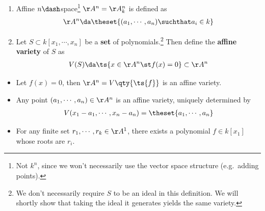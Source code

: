 \begin{definition}

\envlist

\begin{enumerate}
\def\labelenumi{\arabic{enumi}.}
\item
  Affine \(n\dash\)space\footnote{Not \(k^n\), since we won't
    necessarily use the vector space structure (e.g.~adding points).}
  \(\AA^n = \AA_k^n\) is defined as
  \begin{align*}
  \AA^n \da \theset{(a_1, \cdots, a_n) \suchthat a_i \in k}
  \end{align*}
\item
  Let \(S\subset k[x_1, \cdots, x_n]\) be a \textbf{set} of
  polynomials.\footnote{We don't necessarily require \(S\) to be an
    ideal in this definition. We will shortly show that taking the ideal
    it generates yields the same variety.} Then define the
  \textbf{affine variety} of \(S\) as
  \begin{align*}
    V(S) \da \ts{x\in \AA^n \st f(x) = 0} \subset \AA^n
    \end{align*}
\end{enumerate}

\end{definition}

\begin{example}

\envlist

\begin{itemize}
\tightlist
\item
  Let \(f(x) = 0\), then \(\AA^n = V\qty{\ts{f}}\) is an affine variety.
\item
  Any point \((a_1, \cdots, a_n)\in \AA^n\) is an affine variety,
  uniquely determined by
  \begin{align*}
  V(x_1 - a_1, \cdots, x_n - a_n) = \theset{a_1, \cdots, a_n}
  \end{align*}
\item
  For any finite set \(r_1, \cdots, r_k \in \AA^1\), there exists a
  polynomial \(f\in k[x_1]\) whose roots are \(r_i\).
\end{itemize}

\end{example}


